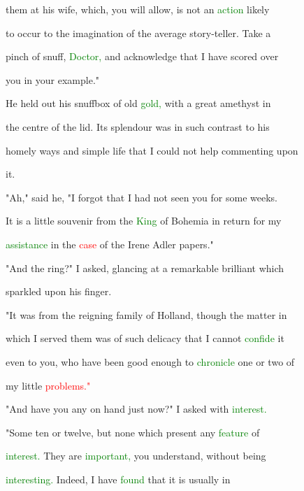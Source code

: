  them at his wife, which, you will allow, is not an \textcolor{green}{action} likely

 to occur to the imagination of the average story-teller. Take a

 pinch of snuff, \textcolor{green}{Doctor,} and acknowledge that I have \textcolor{BurntOrange}{scored} over

 you in your example."



 He held out his snuffbox of old \textcolor{green}{gold,} with a great amethyst in

 the centre of the lid. Its splendour was in such contrast to his

 homely ways and simple life that I could not help commenting upon

 it.



 "Ah," said he, "I forgot that I had not seen you for some weeks.

 It is a little souvenir from the \textcolor{green}{King} of Bohemia in return for my

 \textcolor{green}{assistance} in the \textcolor{red}{case} of the Irene Adler papers."



 "And the ring?" I asked, glancing at a \textcolor{BurntOrange}{remarkable} \textcolor{BurntOrange}{brilliant} which

 \textcolor{BurntOrange}{sparkled} upon his finger.



 "It was from the reigning family of Holland, though the matter in

 which I \textcolor{BurntOrange}{served} them was of such delicacy that I cannot \textcolor{green}{confide} it

 even to you, who have been \textcolor{BurntOrange}{good} enough to \textcolor{green}{chronicle} one or two of

 my little \textcolor{red}{problems."}



 "And have you any on hand just now?" I asked with \textcolor{green}{interest.}



 "Some ten or twelve, but none which \textcolor{BurntOrange}{present} any \textcolor{green}{feature} of

 \textcolor{green}{interest.} They are \textcolor{green}{important,} you understand, without being

 \textcolor{green}{interesting.} Indeed, I have \textcolor{green}{found} that it is usually in

